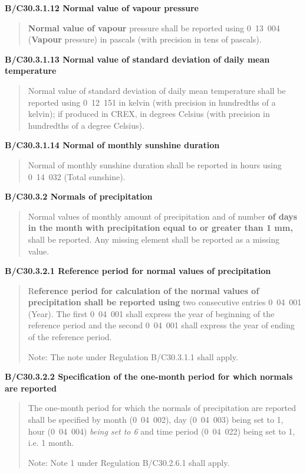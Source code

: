 \textbf{B/C30.3.1.12 Normal value of vapour pressure}

\begin{quote}
\textbf{Normal value of vapour} pressure shall be reported using 0~13~004 (\textbf{Vapour} pressure) in pascals (with precision in tens of pascals).
\end{quote}

\textbf{B/C30.3.1.13 Normal value of standard deviation of daily mean temperature}

\begin{quote}
Normal value of standard deviation of daily mean temperature shall be reported using 0~12~151 in kelvin (with precision in hundredths of a kelvin); if produced in CREX, in degrees Celsius (with precision in hundredths of a degree Celsius).
\end{quote}

\textbf{B/C30.3.1.14 Normal of monthly sunshine duration}

\begin{quote}
Normal of monthly sunshine duration shall be reported in hours using 0~14~032 (Total sunshine).
\end{quote}

\textbf{B/C30.3.2 Normals of precipitation}

\begin{quote}
Normal values of monthly amount of precipitation and of number \textbf{of days in the month with precipitation equal to or greater than 1 mm,} shall be reported. Any missing element shall be reported as a missing value.
\end{quote}

\textbf{B/C30.3.2.1 Reference period for normal values of precipitation}

\begin{quote}
R\textbf{eference period for calculation of the normal values of precipitation shall be reported using} two consecutive entries 0~04~001 (Year). The first 0~04~001 shall express the year of beginning of the reference period and the second 0~04~001 shall express the year of ending of the reference period.

Note: The note under Regulation B/C30.3.1.1 shall apply.
\end{quote}

\textbf{B/C30.3.2.2 Specification of the one-month period for which normals are reported}

\begin{quote}
The one-month period for which the normals of precipitation are reported shall be specified by month (0~04~002), day (0~04~003) being set to 1, hour (0~04~004) \emph{being set to 6} and time period (0~04~022) being set to 1, i.e. 1 month.

Note: Note 1 under Regulation B/C30.2.6.1 shall apply.
\end{quote}

